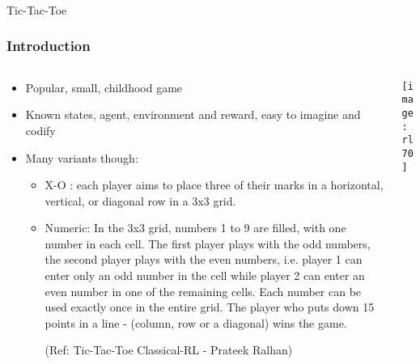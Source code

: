 \begin{frame}[fragile]\frametitle{}
\begin{center}
{\Large Tic-Tac-Toe}
\end{center}
\end{frame}


\begin{frame}[fragile]\frametitle{Introduction}


\begin{columns}
\begin{column}{0.5\textwidth}
\begin{itemize}
\item Popular, small, childhood game
\item Known states, agent, environment and reward, easy to imagine and codify
\item Many variants though:
	\begin{itemize}
	\item X-O : each player aims to place three of their marks in a horizontal, vertical, or diagonal row in a 3x3 grid. 
	\item Numeric: In the 3x3 grid, numbers 1 to 9 are filled, with one number in each cell. The first player plays with the odd numbers, the second player plays with the even numbers, i.e. player 1 can enter only an odd number in the cell while player 2 can enter an even number in one of the remaining cells. Each number can be used exactly once in the entire grid. The player who puts down 15 points in a line - (column, row or a diagonal) wins the game.
	
	{\tiny (Ref: Tic-Tac-Toe Classical-RL - Prateek Ralhan)}
	\end{itemize}
\end{itemize}

\end{column}
\begin{column}{0.5\textwidth}  %
\begin{center}
\texttt{[image: rl70]}
\end{center}
\end{column}
\end{columns}

\end{frame}

